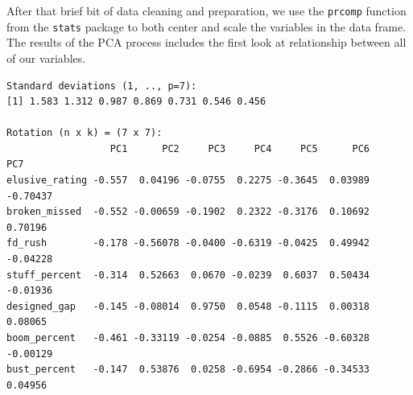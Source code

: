 \documentclass[
  letterpaper,
]{krantz}
\newenvironment{Shaded}{\begin{snugshade}}{\end{snugshade}}
\newcommand{\AttributeTok}[1]{\textcolor[rgb]{0.40,0.45,0.13}{#1}}
\newcommand{\ConstantTok}[1]{\textcolor[rgb]{0.56,0.35,0.01}{#1}}
\newcommand{\FunctionTok}[1]{\textcolor[rgb]{0.28,0.35,0.67}{#1}}
\newcommand{\NormalTok}[1]{\textcolor[rgb]{0.00,0.23,0.31}{#1}}
\newcommand{\OtherTok}[1]{\textcolor[rgb]{0.00,0.23,0.31}{#1}}
\newcommand{\SpecialCharTok}[1]{\textcolor[rgb]{0.37,0.37,0.37}{#1}}
\begin{document}
\begin{Shaded}
\end{Shaded}

After that brief bit of data cleaning and preparation, we use the
\texttt{prcomp} function from the \texttt{stats} package to both center
and scale the variables in the data frame. The results of the PCA
process includes the first look at relationship between all of our
variables.

\begin{verbatim}
Standard deviations (1, .., p=7):
[1] 1.583 1.312 0.987 0.869 0.731 0.546 0.456

Rotation (n x k) = (7 x 7):
                  PC1      PC2     PC3     PC4     PC5      PC6      PC7
elusive_rating -0.557  0.04196 -0.0755  0.2275 -0.3645  0.03989 -0.70437
broken_missed  -0.552 -0.00659 -0.1902  0.2322 -0.3176  0.10692  0.70196
fd_rush        -0.178 -0.56078 -0.0400 -0.6319 -0.0425  0.49942 -0.04228
stuff_percent  -0.314  0.52663  0.0670 -0.0239  0.6037  0.50434 -0.01936
designed_gap   -0.145 -0.08014  0.9750  0.0548 -0.1115  0.00318  0.08065
boom_percent   -0.461 -0.33119 -0.0254 -0.0885  0.5526 -0.60328 -0.00129
bust_percent   -0.147  0.53876  0.0258 -0.6954 -0.2866 -0.34533  0.04956
\end{verbatim}
\end{document}
